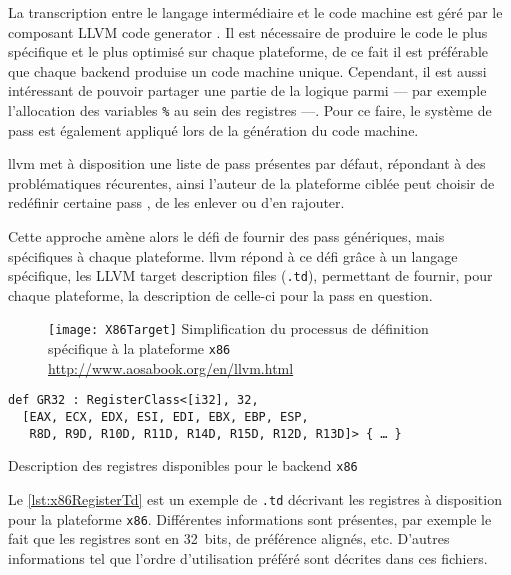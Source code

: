 La transcription entre le langage intermédiaire et le code machine est géré par le composant \og LLVM code generator \fg. Il est nécessaire de produire le code le plus spécifique et le plus optimisé sur chaque plateforme, de ce fait il est préférable que chaque \og backend \fg produise un code machine unique. Cependant, il est aussi intéressant de pouvoir partager une partie de la logique parmi --- par exemple l'allocation des variables \texttt{\%} au sein des registres ---. Pour ce faire, le système de \og pass \fg est également appliqué lors de la génération du code machine.

\gls{llvm} met à disposition une liste de \og pass \fg présentes par défaut, répondant à des problématiques récurentes, ainsi l'auteur de la plateforme ciblée peut choisir de redéfinir certaine \og pass \fg, de les enlever ou d'en rajouter.

Cette approche amène alors le défi de fournir des \og pass \fg génériques, mais spécifiques à chaque plateforme. \gls{llvm} répond à ce défi grâce à un langage spécifique, les \og LLVM target description files \fg (\texttt{.td}), permettant de fournir, pour chaque plateforme, la description de celle-ci pour la \og pass \fg en question.

\begin{figure}[H]
	\centering
	\texttt{[image: X86Target]}
	{Simplification du processus de définition spécifique à la plateforme \texttt{x86}}
	{\url{http://www.aosabook.org/en/llvm.html}}
	\label{fig:X86Target}
\end{figure}

\vfill

\begin{listing}
	\begin{verbatim}
def GR32 : RegisterClass<[i32], 32,
  [EAX, ECX, EDX, ESI, EDI, EBX, EBP, ESP,
   R8D, R9D, R10D, R11D, R14D, R15D, R12D, R13D]> { … }
	\end{verbatim}
	\caption{Description des registres disponibles pour le \og backend \fg \texttt{x86}}
	\label{lst:x86RegisterTd}
\end{listing}

Le \autoref{lst:x86RegisterTd} est un exemple de \texttt{.td} décrivant les registres à disposition pour la plateforme \texttt{x86}. Différentes informations sont présentes, par exemple le fait que les registres sont en 32~bits, de préférence alignés, etc. D'autres informations tel que l'ordre d'utilisation préféré sont décrites dans ces fichiers.

